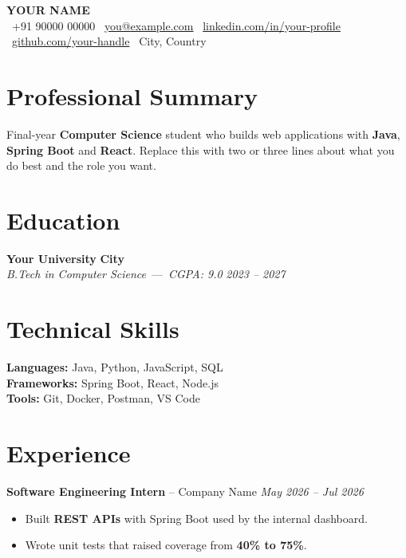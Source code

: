\documentclass[11pt,a4paper]{article}
\newenvironment{resumebody}{\begin{list}{}{\setlength{\leftmargin}{0.8em}\setlength{\topsep}{0pt}\setlength{\itemsep}{0pt}\setlength{\parsep}{0pt}}\item[]}{\end{list}}
\begin{document}
\noindent\begin{minipage}[b][\dimexpr\textheight-2pt\relax][s]{\linewidth}
\begin{center}
{\selectfont\Huge\bfseries\color{accent} \MakeUppercase{Your Name}}\\[5pt]
{\small \faPhone\ +91 90000 00000 \quad \faEnvelope\ \href{mailto:you@example.com}{you@example.com} \quad \faLinkedin\ \href{https://linkedin.com/in/your-profile}{linkedin.com/in/your-profile} \quad \faGithub\ \href{https://github.com/your-handle}{github.com/your-handle} \quad \faMapMarker*\ City, Country}
\end{center}

\section{Professional Summary}
\begin{resumebody}
Final-year \textbf{Computer Science} student who builds web applications with \textbf{Java}, \textbf{Spring Boot} and \textbf{React}. Replace this with two or three lines about what you do best and the role you want.
\end{resumebody}

\section{Education}
\begin{resumebody}
\textbf{Your University} \hfill \textbf{City}\\
\textit{B.Tech in Computer Science} \,---\, \textit{CGPA: 9.0} \hfill \textit{2023 -- 2027}
\end{resumebody}

\section{Technical Skills}
\begin{resumebody}
\textbf{Languages:} Java, Python, JavaScript, SQL\\
\textbf{Frameworks:} Spring Boot, React, Node.js\\
\textbf{Tools:} Git, Docker, Postman, VS Code
\end{resumebody}

\section{Experience}
\begin{resumebody}
  \textbf{Software Engineering Intern} -- Company Name \hfill \textit{May 2026 -- Jul 2026}\\[-9pt]
  \begin{itemize}
    \item Built \textbf{REST APIs} with Spring Boot used by the internal dashboard.
    \item Wrote unit tests that raised coverage from \textbf{40\% to 75\%}.
  \end{itemize}
  \vspace{3pt plus 6pt}
\end{resumebody}


\end{minipage}
\end{document}
